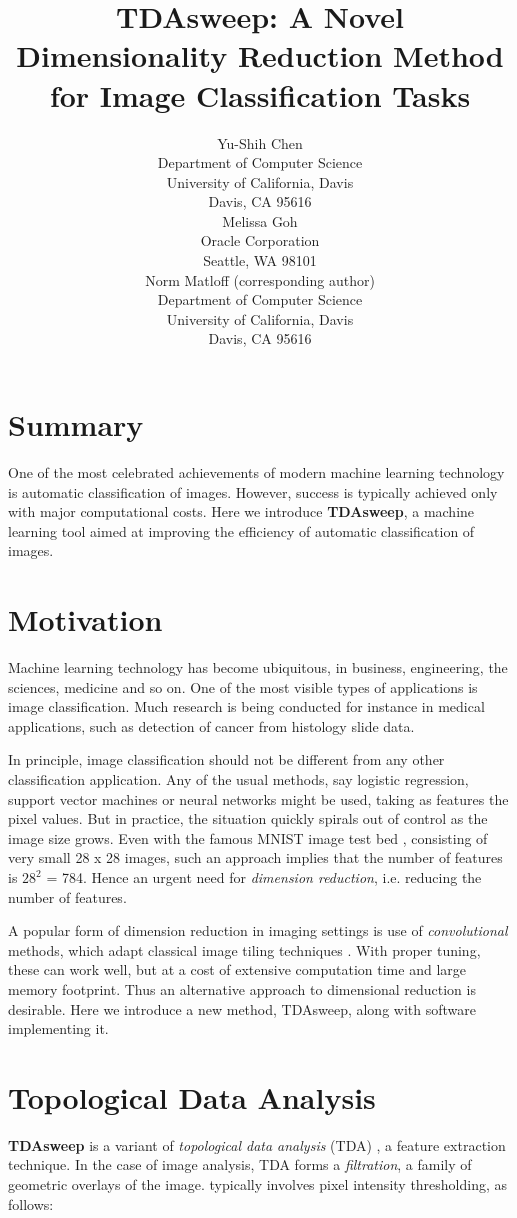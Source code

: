 \documentclass{article}
\title{TDAsweep: A Novel Dimensionality Reduction Method for Image Classification Tasks}
\author{
 Yu-Shih Chen \\
  Department of Computer Science\\
  University of California, Davis\\
  Davis, CA 95616 \\
   \And
 Melissa Goh \\
  Oracle Corporation\\
  Seattle, WA 98101 \\
  \And
 Norm Matloff (corresponding author)\\
  Department of Computer Science\\
  University of California, Davis\\
  Davis, CA 95616 \\
}
\begin{document}
\maketitle



\section{Summary}
One of the most celebrated achievements of modern machine learning technology is automatic classification of images. However, success is typically achieved only with major computational costs. Here we introduce \textbf{TDAsweep}, a machine learning tool aimed at improving the efficiency of automatic classification of images.


\section{Motivation}
Machine learning technology has become ubiquitous, in business, engineering, the sciences, medicine and so on. One of the most visible types of applications is image classification. Much research is being conducted for instance in medical applications, such as detection of cancer from histology slide data.

In principle, image classification should not be different from any other classification application. Any of the usual methods, say logistic regression, support vector machines or neural networks might be used, taking as features the pixel values. But in practice, the situation quickly spirals out of control as the image size grows. Even with the famous MNIST image test bed \cite{lecun2010mnist}, consisting of very small 28 x 28 images, such an approach implies that the number of features is $28^2$ = 784. Hence an urgent need for \emph{dimension reduction}, i.e. reducing the number of features.

A popular form of dimension reduction in imaging settings is use of \emph{convolutional} methods, which adapt classical image tiling techniques \cite{chollet_allaire_2018}. With proper tuning, these can work well, but at a cost of extensive computation time and large memory footprint. Thus an alternative approach to dimensional reduction is desirable. Here we introduce a new method, TDAsweep, along with software implementing it.


\section{Topological Data Analysis}
\textbf{TDAsweep} is a variant of \emph{topological data analysis} (TDA) \cite{doi:10.1146/annurev-statistics-031017-100045}, a feature extraction technique. In the case of image analysis, TDA forms a \emph{filtration}, a family of geometric overlays of the image. typically involves pixel intensity thresholding, as follows:
\end{document}
